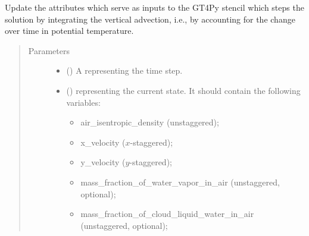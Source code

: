 \documentclass[letterpaper,10pt,english]{sphinxmanual}
\begin{document}
\begin{fulllineitems}
\begin{fulllineitems}
\begin{quote}
\begin{description}
\begin{itemize}
\end{itemize}


\end{description}\end{quote}

\end{fulllineitems}


\begin{fulllineitems}
\label{\detokenize{api:dycore.prognostic_isentropic_nonconservative.PrognosticIsentropicNonconservative._stencil_stepping_by_coupling_physics_with_dynamics_set_inputs}}
Update the attributes which serve as inputs to the GT4Py stencil which steps the solution
by integrating the vertical advection, i.e., by accounting for the change over time in potential temperature.
\begin{quote}\begin{description}
\item[{Parameters}] \leavevmode\begin{itemize}
\item {} 
 () \textendash{} A  representing the time step.

\item {} 
 () \textendash{} 
{\hyperref[\detokenize{api:storages.state_isentropic.StateIsentropic}]{}} representing the current state.
It should contain the following variables:
\begin{itemize}
\item {} 
air\_isentropic\_density (unstaggered);

\item {} 
x\_velocity (\(x\)-staggered);

\item {} 
y\_velocity (\(y\)-staggered);

\item {} 
mass\_fraction\_of\_water\_vapor\_in\_air (unstaggered, optional);

\item {} 
mass\_fraction\_of\_cloud\_liquid\_water\_in\_air (unstaggered, optional);


\end{itemize}
\end{itemize}
\end{description}
\end{quote}
\end{fulllineitems}
\end{fulllineitems}
\end{document}
